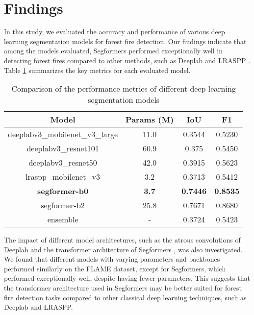 \section{Findings}

In this study, we evaluated the accuracy and performance of various deep learning segmentation models for forest fire detection. Our findings indicate that among the models evaluated, Segformers \cite{xie_segformer_2021} performed exceptionally well in detecting forest fires compared to other methods, such as Deeplab \cite{chen_rethinking_2017} and LRASPP \cite{howard2019searching}. Table \ref{table:1} summarizes the key metrics for each evaluated model.

\begin{table}[!htbp]
    \centering
    \caption{Comparison of the performance metrics of different deep learning segmentation models}
    \begin{tabular}{c|c|c|c}
    \hline
        \textbf{Model} & \textbf{Params (M)} & \textbf{IoU} & \textbf{F1} \\ \hline
        deeplabv3\_mobilenet\_v3\_large & 11.0 & 0.3544 & 0.5230 \\ \hline
        deeplabv3\_resnet101 & 60.9 & 0.375 & 0.5450 \\ \hline
        deeplabv3\_resnet50 & 42.0 & 0.3915 & 0.5623 \\ \hline
        lraspp\_mobilenet\_v3 & 3.2 & 0.3713 & 0.5412 \\ \hline
        \textbf{segformer-b0} & \textbf{3.7} & \textbf{0.7446} & \textbf{0.8535} \\ \hline
        segformer-b2 & 25.8 & 0.7671 & 0.8680 \\ \hline
        ensemble & - & 0.3724 & 0.5423 \\ \hline
    \end{tabular}
    \label{table:1}
\end{table}

The impact of different model architectures, such as the atrous convolutions of Deeplab \cite{chen_rethinking_2017} and the transformer architecture of Segformers \cite{xie_segformer_2021}, was also investigated. We found that different models with varying parameters and backbones performed similarly on the FLAME dataset, except for Segformers, which performed exceptionally well, despite having fewer parameters. This suggests that the transformer architecture used in Segformers \cite{xie_segformer_2021} may be better suited for forest fire detection tasks compared to other classical deep learning techniques, such as Deeplab and LRASPP.

